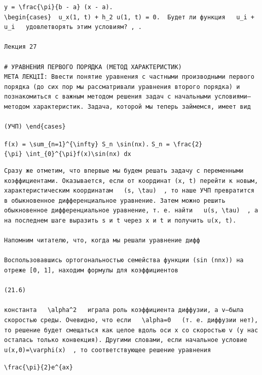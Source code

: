 \documentclass[
  ukrainian,
]{article}
\begin{document}
\begin{verbatim}
y = \frac{\pi}{b - a} (x - a).
\begin{cases}  u_x(1, t) + h_2 u(1, t) = 0.  Будет ли функция   u_i + u_i   удовлетворять этим условиям? , .

Лекция 27

# УРАВНЕНИЯ ПЕРВОГО ПОРЯДКА (МЕТОД ХАРАКТЕРИСТИК)
МЕТА ЛЕКЦІЇ: Ввести понятие уравнения с частными производными первого порядка (до сих пор мы рассматривали уравнения второго порядка) и познакомиться с важным методом решения задач с начальными условиями—методом характеристик. Задача, которой мы теперь займемся, имеет вид

(УЧП) \end{cases}
\end{verbatim}

\texttt{\textquotesingle{}f(x)\textquotesingle{}\ =\ \textbackslash{}sum\_\{n=1\}\^{}\{\textbackslash{}infty\}\ \textquotesingle{}S\_n\textquotesingle{}\ \textbackslash{}sin(nx).}
\texttt{S\_\textquotesingle{}n\ =\ \textbackslash{}frac\{2\}\{\textbackslash{}pi\}\ \textbackslash{}int\_\{0\}\^{}\{\textbackslash{}pi\}\textquotesingle{}f(x)\textquotesingle{}\textbackslash{}sin(nx)\ dx\textquotesingle{}}

\begin{verbatim}
Сразу же отметим, что впервые мы будем решать задачу с переменными коэффициентами. Оказывается, если от координат (x, t) перейти к новым, характеристическим координатам   (s, \tau)  , то наше УЧП превратится в обыкновенное дифференциальное уравнение. Затем можно решить обыкновенное дифференциальное уравнение, т. е. найти   u(s, \tau)  , а на последнем шаге выразить s и t через x и t и получить u(x, t).

Напомним читателю, что, когда мы решали уравнение дифф

Воспользовавшись ортогональностью семейства функции (sin (nnx)) на отреже [0, 1], находим формулы для коэффициентов

(21.6) 

константа   \alpha^2   играла роль коэффициента диффузии, а v—была скоростью среды. Очевидно, что если   \alpha=0   (т. е. диффузии нет), то решение будет смещаться как целое вдоль оси x со скоростью v (у нас осталась только конвекция). Другими словами, если начальное условие   u(x,0)=\varphi(x)  , то соответствующее решение уравнения
\end{verbatim}

\texttt{\textquotesingle{}\textbackslash{}frac\{\textbackslash{}pi\}\{2\}\textquotesingle{}e\^{}\{ax\}}
\end{document}
